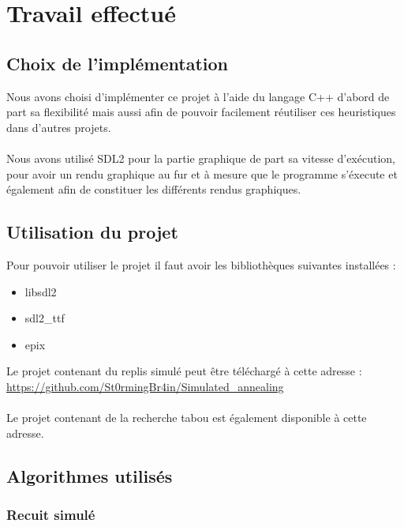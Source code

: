 \section{Travail effectué}

\subsection{Choix de l'implémentation}

Nous avons choisi d'implémenter ce projet à l'aide du langage C++ d'abord de part sa flexibilité mais aussi afin de pouvoir facilement réutiliser ces heuristiques dans d'autres projets.\\ \\
Nous avons utilisé SDL2 pour la partie graphique de part sa vitesse d'exécution, pour avoir un rendu graphique au fur et à mesure que le programme s'éxecute et également afin de constituer les différents rendus graphiques.

\subsection{Utilisation du projet}

Pour pouvoir utiliser le projet il faut avoir les bibliothèques suivantes installées :
\begin{itemize}
    \item libsdl2
    \item sdl2\_ttf
    \item epix
\end{itemize}

Le projet contenant du replis simulé peut être téléchargé à cette adresse : \\ 
\url{https://github.com/St0rmingBr4in/Simulated_annealing} \\ \\

Le projet contenant de la recherche tabou est également disponible à cette adresse.
\newpage


\subsection{Algorithmes utilisés}
\subsubsection{Recuit simulé}
